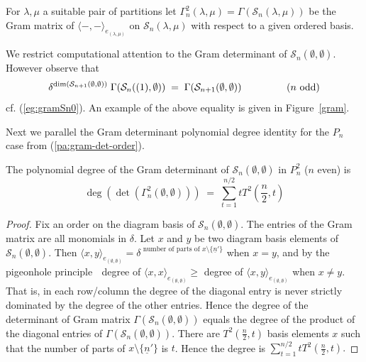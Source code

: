 \documentclass[reqno,10pt,a4paper]{amsart}
\newcommand{\blue}[1]{\textcolor{blue}{#1}}
\newcommand{\ppmm}[1]{{#1}}
\newcommand{\ca}[1]{\blue{#1}}
\newcommand{\nk}{n}  %
\newcommand{\spine}{\mathcal{S}_n(\emptyset,\emptyset)}
\newcommand{\cell}{\mathcal{S}}
\newcommand{\T}{T^2}  %
\newcommand{\Gram}{\Gamma}
\begin{document}

\mdef 
For $\lambda,\mu$ a suitable pair of partitions let 
$\Gram^2_n(\lambda,\mu) = \Gram(\cell_\nk(\lambda,\mu))$ be the Gram matrix of 
$\langle -, -\rangle_{e_{(\lambda,\mu)}}$ on $\cell_\nk(\lambda,\mu)$ with respect to a given ordered basis.

We restrict  %
computational 
attention to the Gram determinant of  $\cell_\nk(\emptyset,\emptyset)$. 
However observe that  %
\begin{equation}\label{odd-even}
\delta^{\dim(\cell_{\nk+1}(\emptyset,\emptyset))}    %
 \;   \Gram(\cell_\nk((1),\emptyset))
    \;   = \;  \Gram(\cell_{\nk+1}(\emptyset,\emptyset))
\hspace{1.6cm} \mbox{($n$ odd)}
\end{equation}
 cf. (\ref{eg:gramSn0}).
An example of the above equality is given in Figure~\ref{gram}.

\medskip 



Next we parallel the Gram determinant polynomial degree identity  
for the $P_n$ case
from (\ref{pa:gram-det-order}). %

\begin{lem} \label{lem:degg}
The polynomial degree  %
of the Gram determinant of $\cell_\nk(\emptyset,\emptyset)$ 
{in $P^2_\nk$} ($n$ even)
is 
$$
\deg( \det( \Gamma^2_n(\emptyset,\emptyset))) \; = \; 
\sum_{t=1}^{\nk/2} t \T(\frac{\nk}{2}, t)
$$
\end{lem}
\begin{proof}
Fix an order on the diagram basis of $\cell_\nk(\emptyset,\emptyset)$.  
The entries of the Gram matrix are all monomials in $\delta$. 
Let $x$ and $y$ be two diagram basis 
\ppmm{elements}
of $\spine$. Then  
$\langle x, y\rangle_{e_{(\emptyset,\emptyset)}}
 = \delta^{\text{ number of parts of }x\setminus \{\underline{n}'\}} $ 
 when $x=y$, and by the pigeonhole principle 
$\;$ degree of $\langle x, x\rangle_{e_{(\emptyset,\emptyset)}}\geq$ degree of $ \langle x, y\rangle_{e_{(\emptyset,\emptyset)}}$ 
when $x\neq y$. 
That is, in each row/column the degree of the diagonal entry is never strictly dominated by the degree of the other entries. 
Hence the degree of 
 the determinant of Gram matrix 
 $\Gram(\spine)$   %
 equals the 
 degree of the product of the diagonal entries of 
 $\Gram(\spine).$ 
 There are $\T(\frac{\nk}{2}, t)$ basis 
 {elements}
 $x$ such that the number of parts of $x\setminus \{\underline{\nk}'\}$ is $t$. 
 Hence the degree  %
 is 
$
\sum_{t=1}^{\nk/2} t \T(\frac{\nk}{2}, t).
$
\end{proof}
\end{document}
